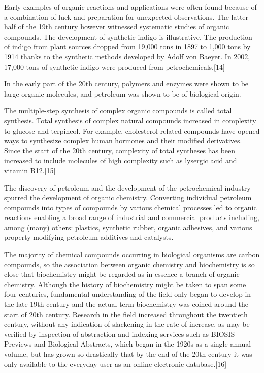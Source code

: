 \documentclass[
]{book}
\begin{document}
Early examples of organic reactions and applications were often found because of a combination of luck and preparation for unexpected observations. The latter half of the 19th century however witnessed systematic studies of organic compounds. The development of synthetic indigo is illustrative. The production of indigo from plant sources dropped from 19,000 tons in 1897 to 1,000 tons by 1914 thanks to the synthetic methods developed by Adolf von Baeyer. In 2002, 17,000 tons of synthetic indigo were produced from petrochemicals.{[}14{]}

In the early part of the 20th century, polymers and enzymes were shown to be large organic molecules, and petroleum was shown to be of biological origin.

The multiple-step synthesis of complex organic compounds is called total synthesis. Total synthesis of complex natural compounds increased in complexity to glucose and terpineol. For example, cholesterol-related compounds have opened ways to synthesize complex human hormones and their modified derivatives. Since the start of the 20th century, complexity of total syntheses has been increased to include molecules of high complexity such as lysergic acid and vitamin B12.{[}15{]}

The discovery of petroleum and the development of the petrochemical industry spurred the development of organic chemistry. Converting individual petroleum compounds into types of compounds by various chemical processes led to organic reactions enabling a broad range of industrial and commercial products including, among (many) others: plastics, synthetic rubber, organic adhesives, and various property-modifying petroleum additives and catalysts.

The majority of chemical compounds occurring in biological organisms are carbon compounds, so the association between organic chemistry and biochemistry is so close that biochemistry might be regarded as in essence a branch of organic chemistry. Although the history of biochemistry might be taken to span some four centuries, fundamental understanding of the field only began to develop in the late 19th century and the actual term biochemistry was coined around the start of 20th century. Research in the field increased throughout the twentieth century, without any indication of slackening in the rate of increase, as may be verified by inspection of abstraction and indexing services such as BIOSIS Previews and Biological Abstracts, which began in the 1920s as a single annual volume, but has grown so drastically that by the end of the 20th century it was only available to the everyday user as an online electronic database.{[}16{]}
\end{document}
